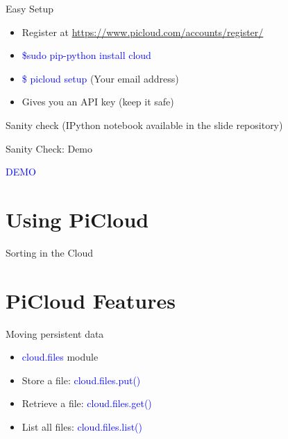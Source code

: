 \documentclass{beamer} \usepackage{fancyvrb} \usepackage{listings}
\begin{document}
      \begin{frame}{Easy Setup}
        \begin{itemize}
        \item Register at
          \url{https://www.picloud.com/accounts/register/}
        \item \textcolor{blue}{\$sudo pip-python install cloud}
        \item \textcolor{blue}{\$ picloud setup} (Your email address)
        \item Gives you an API key (keep it safe)
        \end{itemize}

      \end{frame}

      \begin{frame}{Sanity check}
        \centering(IPython notebook available in the slide repository)
        
        
      \end{frame}

      \begin{frame}{Sanity Check: Demo}
        \begin{center}
          \textcolor{blue}{DEMO}
        \end{center}
      \end{frame}
      

      \section{Using PiCloud}
      \begin{frame}{Sorting in the Cloud}
        
        
      \end{frame}


      \section{PiCloud Features}

      \begin{frame}{Moving persistent data}
        \begin{itemize}
        \item \textcolor{blue}{cloud.files} module
        \item Store a file: \textcolor{blue}{cloud.files.put()}
        \item Retrieve a file: \textcolor{blue}{cloud.files.get()}
        \item List all files: \textcolor{blue}{cloud.files.list()}
        \end{itemize}
      \end{frame}
\end{document}
